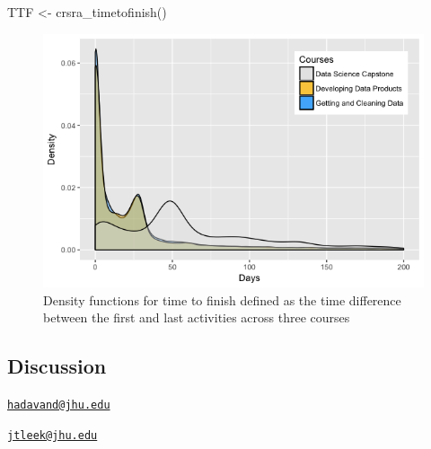 \begin{Schunk}
\begin{Sinput}
TTF <- crsra_timetofinish()
\end{Sinput}
\end{Schunk}

\begin{figure}[htbp]
    \centering
    \includegraphics[scale=0.6]{timetofinish}
    \caption{Density functions for time to finish defined as the time difference between the first and last activities across three courses}
    \label{figure:timetofinish}
\end{figure}

\subsection{Discussion}\label{discussion}



\address{%
Aboozar Hadavand\\
Bloomberg School of Public Health, Johns Hopkins University\\
615 N. Wolfe Street\\ Baltimore, MD 21205, USA\\
}
\href{mailto:hadavand@jhu.edu}{\nolinkurl{hadavand@jhu.edu}}

\address{%
Jeffrey Leek\\
Bloomberg School of Public Health, Johns Hopkins University\\
615 N. Wolfe Street\\ Baltimore, MD 21205, USA\\
}
\href{mailto:jtleek@jhu.edu}{\nolinkurl{jtleek@jhu.edu}}

